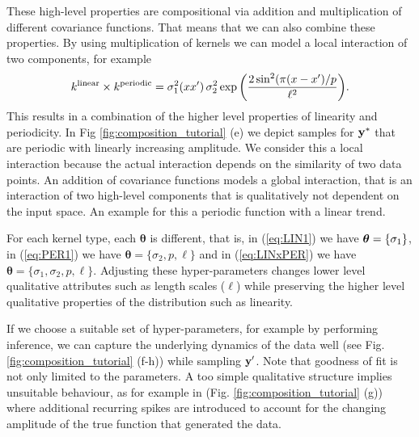 These high-level properties are compositional via addition and multiplication of different covariance functions. 
That means that we can also combine these properties.
By using multiplication of kernels we can model a local interaction of two components, for example 
\begin{equation}\label{eq:LINxPER}
    k^\text{linear} \times k^\text{periodic} =  \sigma_1^2(x x^\prime)\, \sigma_2^2 \exp \bigg(
\frac{2 \sin^2 ( \pi (x - x^\prime)/p}{\ell^2} \bigg).
\end{equation}
This results in a combination of the higher level properties of linearity and  periodicity.
In Fig \ref{fig:composition_tutorial} (e) we depict samples for $\mathbf{y}^*$ that are periodic
with linearly increasing amplitude.
We consider this a local interaction because the actual interaction depends on the similarity
of two data points.
An addition of covariance functions models a global interaction, that is an interaction of two high-level components that is qualitatively not dependent on the input space. An example for this a periodic function with a linear
trend.

For each kernel type, each $\bm{\theta}$ is different, that is, in (\ref{eq:LIN1}) we have $\bm{\theta}=\{\sigma_1\}$,
in (\ref{eq:PER1}) we have $\bm{\theta}=\{\sigma_2,p,\ell\}$ and in 
(\ref{eq:LINxPER}) we have $\bm{\theta}=\{\sigma_1,\sigma_2,p,\ell\}$.
Adjusting these hyper-parameters changes lower level qualitative attributes such as length
scales ($\ell$) while preserving the higher level qualitative properties of the distribution
such as linearity. 



If we choose a suitable set of hyper-parameters, for example by performing inference, we
can capture the underlying dynamics of the data well (see Fig.
\ref{fig:composition_tutorial} (f-h)) while sampling $\mathbf{y}^\prime$.
Note that goodness of fit is not only limited to the parameters. A too simple qualitative structure
implies unsuitable behaviour, as for example in (Fig. \ref{fig:composition_tutorial} (g)) where additional 
recurring spikes are introduced to account for the changing amplitude of the true function that 
generated the data.





